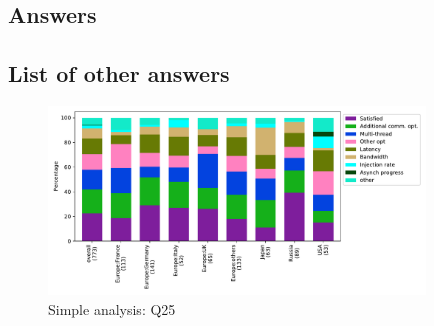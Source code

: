 
\subsection{Answers}


\subsection{List of other answers}
\begin{itemize}

\end{itemize}

\begin{figure}[htb]
\begin{center}
\includegraphics[width=10cm]{../pdfs/Q25.pdf}
\caption{Simple analysis: Q25}
\label{fig:Q25}
\end{center}
\end{figure}
